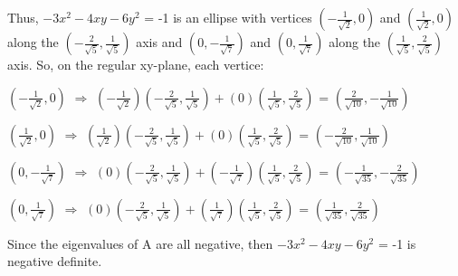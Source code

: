 \begin{tbox}
        Thus, $-3x^2 - 4xy - 6y^2$ = -1 is an ellipse
        with vertices $(-\frac{1}{\sqrt{2}},0)$ and $(\frac{1}{\sqrt{2}},0)$
        along the $(-\frac{2}{\sqrt{5}},\frac{1}{\sqrt{5}})$ axis and
        $(0,-\frac{1}{\sqrt{7}})$ and $(0,\frac{1}{\sqrt{7}})$ along
        the $(\frac{1}{\sqrt{5}},\frac{2}{\sqrt{5}})$ axis.
        So, on the regular xy-plane, each vertice:

        \hspace{0.5cm}
        $(-\frac{1}{\sqrt{2}},0)$
        \hspace{0.5cm}
        $\Rightarrow$
        \hspace{0.5cm}
        $(-\frac{1}{\sqrt{2}})(-\frac{2}{\sqrt{5}},\frac{1}{\sqrt{5}})
            + (0)(\frac{1}{\sqrt{5}},\frac{2}{\sqrt{5}})$
        = $(\frac{2}{\sqrt{10}},-\frac{1}{\sqrt{10}})$

        \hspace{0.5cm}
        $(\frac{1}{\sqrt{2}},0)$
        \hspace{0.8cm}
        $\Rightarrow$
        \hspace{0.5cm}
        $(\frac{1}{\sqrt{2}})(-\frac{2}{\sqrt{5}},\frac{1}{\sqrt{5}})
            + (0)(\frac{1}{\sqrt{5}},\frac{2}{\sqrt{5}})$
        = $(-\frac{2}{\sqrt{10}},\frac{1}{\sqrt{10}})$

        \hspace{0.5cm}
        $(0,-\frac{1}{\sqrt{7}})$
        \hspace{0.5cm}
        $\Rightarrow$
        \hspace{0.5cm}
        $(0)(-\frac{2}{\sqrt{5}},\frac{1}{\sqrt{5}})
            + (-\frac{1}{\sqrt{7}})(\frac{1}{\sqrt{5}},\frac{2}{\sqrt{5}})$
        = $(-\frac{1}{\sqrt{35}},-\frac{2}{\sqrt{35}})$

        \hspace{0.5cm}
        $(0,\frac{1}{\sqrt{7}})$
        \hspace{0.8cm}
        $\Rightarrow$
        \hspace{0.5cm}
        $(0)(-\frac{2}{\sqrt{5}},\frac{1}{\sqrt{5}})
            + (\frac{1}{\sqrt{7}})(\frac{1}{\sqrt{5}},\frac{2}{\sqrt{5}})$
        = $(\frac{1}{\sqrt{35}},\frac{2}{\sqrt{35}})$

        Since the eigenvalues of A are all negative,
        then $-3x^2 - 4xy - 6y^2$ = -1 is negative definite.
    \end{tbox}




